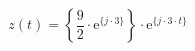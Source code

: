 \[
z(t) =  \left \{ \frac{9}{2} \cdot \textrm{e}^{\{ j \cdot 3 \}} \right \} \cdot \textrm{e}^{\{ j \cdot 3 \cdot t \}}
\]
